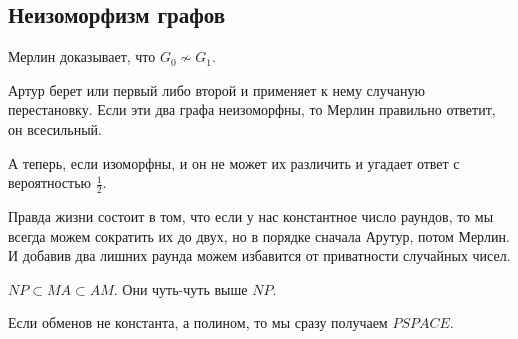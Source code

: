 \subsection{Неизоморфизм графов}
	Мерлин доказывает, что $G_0 \not \sim G_1$.

	Артур берет или первый либо второй и применяет к нему случаную перестановку. 
	Если эти два графа неизоморфны, то Мерлин правильно ответит, он всесильный. 

	А теперь, если изоморфны, и он не может их различить и угадает ответ с вероятностью $\frac{1}{2}$. 


\begin{Rem}
Правда жизни состоит в том, что если у нас константное число 
раундов, то мы всегда можем сократить их до 
двух, но в порядке сначала Арутур, потом Мерлин. И добавив два лишних
раунда можем избавится от приватности случайных чисел. 

$NP \subset MA \subset AM$. Они чуть-чуть выше $NP$.

Если обменов не константа, а полином, то мы сразу получаем $PSPACE$.
\end{Rem}